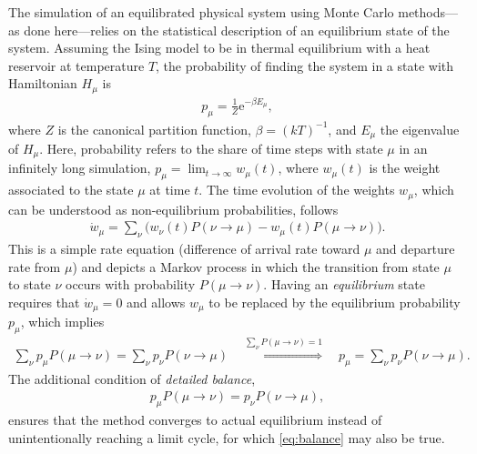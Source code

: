 \documentclass[fleqn]{scrartcl}
\newcommand{\eul}{\mathrm{e}}
\begin{document}
The simulation of an equilibrated physical system using Monte Carlo methods---as done here---relies on the statistical description of an equilibrium state of the system.
Assuming the Ising model to be in thermal equilibrium with a heat reservoir at temperature $T$, the probability of finding the system in a state with Hamiltonian $H_\mu$ is
%
\begin{align} \label{eq:can}
  p_\mu = \frac{1}{Z} \eul^{-\beta E_\mu},
\end{align}
%
where $Z$ is the canonical partition function, $\beta = (k T)^{-1}$, and $E_\mu$ the eigenvalue of $H_\mu$.
Here, probability refers to the share of time steps with state $\mu$ in an infinitely long simulation, $p_\mu = \lim_{t \rightarrow \infty} w_\mu (t)$, where $w_\mu (t)$ is the weight associated to the state $\mu$ at time $t$.
The time evolution of the weights $w_\mu$, which can be understood as non-equilibrium probabilities, follows
%
\begin{align*}
  \dot{w}_\mu = \sum_\nu \Big(w_\nu(t) P(\nu \rightarrow \mu) - w_\mu(t) P(\mu \rightarrow \nu)\Big).
\end{align*}
%
This is a simple rate equation (difference of arrival rate toward $\mu$ and departure rate from $\mu$) and depicts a Markov process in which the transition from state $\mu$ to state $\nu$ occurs with probability $P(\mu \rightarrow \nu)$.
Having an \emph{equilibrium} state requires that $\dot{w}_\mu = 0$ and allows $w_\mu$ to be replaced by the equilibrium probability $p_\mu$, which implies
%
\begin{align} \label{eq:balance}
  \sum_\nu p_\mu P(\mu \rightarrow \nu) = \sum_\nu p_\nu P(\nu \rightarrow \mu) \quad \stackrel{\sum_\nu P(\mu \rightarrow \nu) = 1}{\Longrightarrow} \quad p_\mu = \sum_\nu p_\nu P(\nu \rightarrow \mu).
\end{align}
%
The additional condition of \textsl{detailed balance},
%
\begin{align} \label{eq:detbalance}
  p_\mu P(\mu \rightarrow \nu) = p_\nu P(\nu \rightarrow \mu),
\end{align}
%
ensures that the method converges to actual equilibrium instead of unintentionally reaching a limit cycle, for which \eqref{eq:balance} may also be true.
\end{document}
